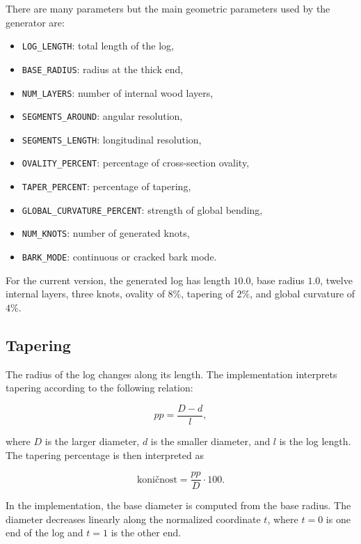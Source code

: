 \documentclass{egpubl}
\begin{document}
There are many parameters but the main geometric parameters used by the generator are:

\begin{itemize}
    \item \texttt{LOG\_LENGTH}: total length of the log,
    \item \texttt{BASE\_RADIUS}: radius at the thick end,
    \item \texttt{NUM\_LAYERS}: number of internal wood layers,
    \item \texttt{SEGMENTS\_AROUND}: angular resolution,
    \item \texttt{SEGMENTS\_LENGTH}: longitudinal resolution,
    \item \texttt{OVALITY\_PERCENT}: percentage of cross-section ovality,
    \item \texttt{TAPER\_PERCENT}: percentage of tapering,
    \item \texttt{GLOBAL\_CURVATURE\_PERCENT}: strength of global bending,
    \item \texttt{NUM\_KNOTS}: number of generated knots,
    \item \texttt{BARK\_MODE}: continuous or cracked bark mode.
\end{itemize}

For the current version, the generated log has length \(10.0\), base radius \(1.0\), twelve internal layers, three knots, ovality of \(8\%\), tapering of \(2\%\), and global curvature of \(4\%\).


\subsection{Tapering}

The radius of the log changes along its length. The implementation interprets tapering according to the following relation:

\[
pp = \frac{D - d}{l},
\]

where \(D\) is the larger diameter, \(d\) is the smaller diameter, and \(l\) is the log length. The tapering percentage is then interpreted as

\[
\text{koni\v{c}nost} = \frac{pp}{D} \cdot 100.
\]

In the implementation, the base diameter is computed from the base radius. The diameter decreases linearly along the normalized coordinate \(t\), where \(t=0\) is one end of the log and \(t=1\) is the other end.
\end{document}

